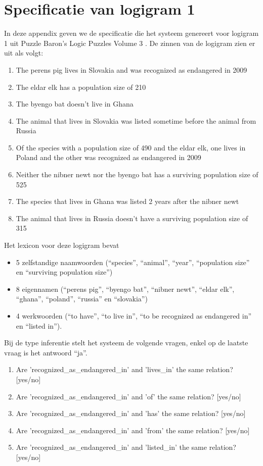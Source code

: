 \chapter{Specificatie van logigram 1}
\label{app:idp}

In deze appendix geven we de specificatie die het systeem genereert voor logigram 1 uit Puzzle Baron's Logic Puzzles Volume 3 \cite{logigrammen}. De zinnen van de logigram zien er uit als volgt:

\begin{enumerate}
 \item The perens pig lives in Slovakia and was recognized as endangered in 2009
 \item The eldar elk has a population size of 210
 \item The byengo bat doesn't live in Ghana
 \item The animal that lives in Slovakia was listed sometime before the animal from Russia
 \item Of the species with a population size of 490 and the eldar elk, one lives in Poland and the other was recognized as endangered in 2009
 \item Neither the nibner newt nor the byengo bat has a surviving population size of 525
 \item The species that lives in Ghana was listed 2 years after the nibner newt
 \item The animal that lives in Russia doesn't have a surviving population size of 315
\end{enumerate}

Het lexicon voor deze logigram bevat
\begin{itemize}
  \item 5 zelfstandige naamwoorden (``species'', ``animal'', ``year'', ``population size'' en ``surviving population size'')
  \item 8 eigennamen (``perens pig'', ``byengo bat'', ``nibner newt'', ``eldar elk'', ``ghana'', ``poland'', ``russia'' en ``slovakia'')
  \item 4 werkwoorden (``to have'', ``to live in'', ``to be recognized as endangered in'' en ``listed in'').
\end{itemize}

Bij de type inferentie stelt het systeem de volgende vragen, enkel op de laatste vraag is het antwoord ``ja''.
\begin{enumerate}
  \item Are 'recognized\_as\_endangered\_in' and 'lives\_in' the same relation? [yes/no]
  \item Are 'recognized\_as\_endangered\_in' and 'of' the same relation? [yes/no]
  \item Are 'recognized\_as\_endangered\_in' and 'has' the same relation? [yes/no]
  \item Are 'recognized\_as\_endangered\_in' and 'from' the same relation? [yes/no]
  \item Are 'recognized\_as\_endangered\_in' and 'listed\_in' the same relation? [yes/no]
\end{enumerate}

